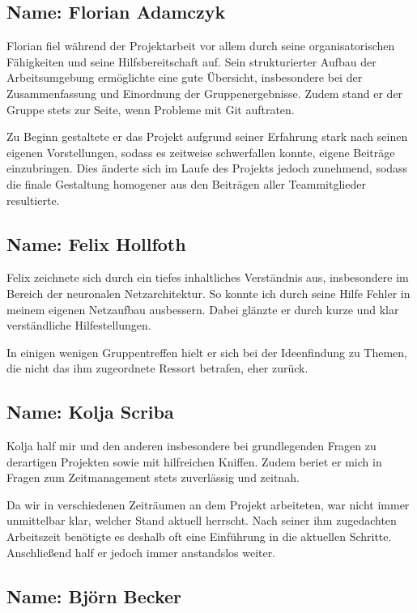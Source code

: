 \documentclass[9pt,a4paper,twocolumn,twoside]{tau-class/tau}
\begin{document}
\subsection*{Name: Florian Adamczyk}

Florian fiel während der Projektarbeit vor allem durch seine organisatorischen Fähigkeiten und seine Hilfsbereitschaft auf. Sein strukturierter Aufbau der Arbeitsumgebung ermöglichte eine gute Übersicht, insbesondere bei der Zusammenfassung und Einordnung der Gruppenergebnisse. Zudem stand er der Gruppe stets zur Seite, wenn Probleme mit Git auftraten. 

Zu Beginn gestaltete er das Projekt aufgrund seiner Erfahrung stark nach seinen eigenen Vorstellungen, sodass es zeitweise schwerfallen konnte, eigene Beiträge einzubringen. Dies änderte sich im Laufe des Projekts jedoch zunehmend, sodass die finale Gestaltung homogener aus den Beiträgen aller Teammitglieder resultierte.

\subsection*{Name: Felix Hollfoth}

Felix zeichnete sich durch ein tiefes inhaltliches Verständnis aus, insbesondere im Bereich der neuronalen Netzarchitektur. So konnte ich durch seine Hilfe Fehler in meinem eigenen Netzaufbau ausbessern. Dabei glänzte er durch kurze und klar verständliche Hilfestellungen.

In einigen wenigen Gruppentreffen hielt er sich bei der Ideenfindung zu Themen, die nicht das ihm zugeordnete Ressort betrafen, eher zurück. 

\subsection*{Name: Kolja Scriba}

Kolja half mir und den anderen insbesondere bei grundlegenden Fragen zu derartigen Projekten sowie mit hilfreichen Kniffen. Zudem beriet er mich in Fragen zum Zeitmanagement stets zuverlässig und zeitnah. 

Da wir in verschiedenen Zeiträumen an dem Projekt arbeiteten, war nicht immer unmittelbar klar, welcher Stand aktuell herrscht. Nach seiner ihm zugedachten Arbeitszeit benötigte es deshalb oft eine Einführung in die aktuellen Schritte. Anschließend half er jedoch immer anstandslos weiter.

\subsection*{Name: Björn Becker}
\end{document}
